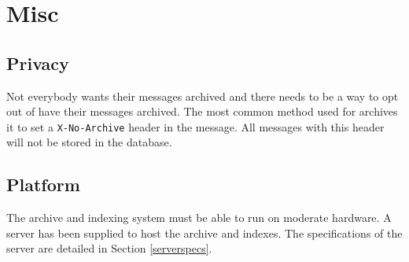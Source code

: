 \section{Misc}
\subsection{Privacy}
Not everybody wants their messages archived and there needs to be a way to
opt out of have their messages archived.  The most common method used for
archives it to set a \texttt{X-No-Archive} header in the message.  
All messages with this header will not be stored in the database.

\subsection{Platform}
The archive and indexing system must be able to run on moderate hardware.  
A server has been supplied to host the archive and indexes.  The
specifications of the server are detailed in Section \ref{serverspecs}.

